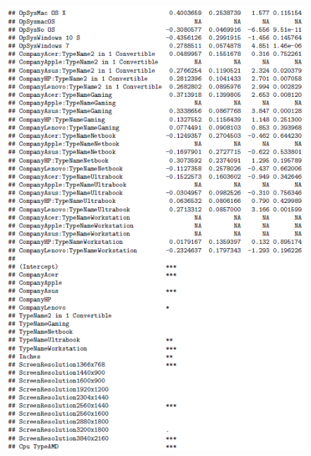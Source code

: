 \documentclass[12pt]{article}
\begin{document}
\begin{figure}[h!]
    \centering
    \includegraphics{Model_3_Sum(2_3).png}
    \label{fig:SUM32}
\end{figure}
\end{document}
